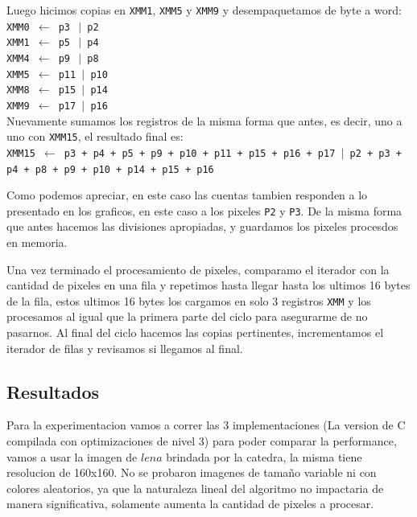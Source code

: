 Luego hicimos copias en \texttt{XMM1}, \texttt{XMM5} y \texttt{XMM9} y desempaquetamos de byte a word:\\

\noindent
\texttt{XMM0 $\gets$ p3 $\ \vert$ p2}\\
\texttt{XMM1 $\gets$ p5 $\ \vert$ p4}\\
\texttt{XMM4 $\gets$ p9 $\ \vert$ p8}\\
\texttt{XMM5 $\gets$ p11 $\vert$ p10}\\
\texttt{XMM8 $\gets$ p15 $\vert$ p14}\\
\texttt{XMM9 $\gets$ p17 $\vert$ p16}\\

Nuevamente sumamos los registros de la misma forma que antes, es decir, uno a uno con \texttt{XMM15}, el resultado final es:\\

\noindent
\texttt{XMM15 $\gets$ p3 + p4 + p5 + p9 + p10 + p11 + p15 + p16 + p17 $\vert$ p2 + p3 + p4 + p8 + p9 + p10 + p14 + p15 + p16}

Como podemos apreciar, en este caso las cuentas tambien responden a lo presentado en los graficos, en este caso a los pixeles \texttt{P2} y \texttt{P3}. De la misma forma que antes hacemos las divisiones apropiadas, y guardamos los pixeles procesdos en memoria.

Una vez terminado el procesamiento de pixeles, comparamo el iterador con la cantidad de pixeles en una fila y repetimos hasta llegar hasta los ultimos 16 bytes de la fila, estos ultimos 16 bytes los cargamos en solo 3 registros \texttt{XMM} y los procesamos al igual que la primera parte del ciclo para asegurarme de no pasarnos. Al final del ciclo hacemos las copias pertinentes, incrementamos el iterador de filas y revisamos si llegamos al final. \\

\newpage
\subsection{Resultados}
Para la experimentacion vamos a correr las 3 implementaciones (La version de C compilada con optimizaciones de nivel 3) para poder comparar la performance, vamos a usar la imagen de $lena$ brindada por la catedra, la misma tiene resolucion de 160x160. No se probaron imagenes de tamaño variable ni con colores aleatorios, ya que la naturaleza lineal del algoritmo no impactaria de manera significativa, solamente aumenta la cantidad de pixeles a procesar.

